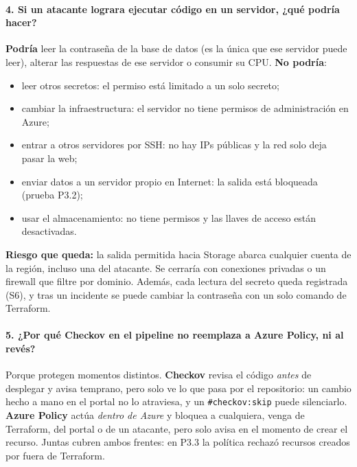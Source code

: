 \documentclass[11pt,letterpaper]{article}
\begin{document}
\paragraph{4. Si un atacante lograra ejecutar código en un servidor, ¿qué podría hacer?}
\textbf{Podría} leer la contraseña de la base de datos (es la única que ese servidor puede leer),
alterar las respuestas de ese servidor o consumir su CPU. \textbf{No podría}:
\begin{itemize}
  \item leer otros secretos: el permiso está limitado a un solo secreto;
  \item cambiar la infraestructura: el servidor no tiene permisos de administración en Azure;
  \item entrar a otros servidores por SSH: no hay IPs públicas y la red solo deja pasar la web;
  \item enviar datos a un servidor propio en Internet: la salida está bloqueada (prueba P3.2);
  \item usar el almacenamiento: no tiene permisos y las llaves de acceso están desactivadas.
\end{itemize}
\textbf{Riesgo que queda:} la salida permitida hacia Storage abarca cualquier cuenta de la región,
incluso una del atacante. Se cerraría con conexiones privadas o un firewall que filtre por dominio.
Además, cada lectura del secreto queda registrada (S6), y tras un incidente se puede cambiar la
contraseña con un solo comando de Terraform.

\paragraph{5. ¿Por qué Checkov en el pipeline no reemplaza a Azure Policy, ni al revés?}
Porque protegen momentos distintos. \textbf{Checkov} revisa el código \emph{antes} de desplegar y
avisa temprano, pero solo ve lo que pasa por el repositorio: un cambio hecho a mano en el portal no
lo atraviesa, y un \texttt{\#checkov:skip} puede silenciarlo. \textbf{Azure Policy} actúa
\emph{dentro de Azure} y bloquea a cualquiera, venga de Terraform, del portal o de un atacante, pero
solo avisa en el momento de crear el recurso. Juntas cubren ambos frentes: en P3.3 la política
rechazó recursos creados por fuera de Terraform.
\end{document}
